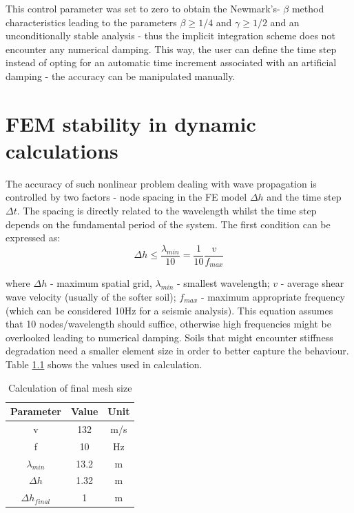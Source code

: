 \documentclass[11pt,a4paper]{report}
\begin{document}
This control parameter was set to zero to obtain the Newmark's- $\beta$ method characteristics leading to the parameters $\beta≥1/4$ and $\gamma ≥1/2$ and an unconditionally stable analysis - thus the implicit integration scheme does not encounter any numerical damping. This way, the user can define the time step instead of opting for an automatic time increment associated with an artificial damping - the accuracy can be manipulated manually.

\newpage
\chapter{FEM stability in dynamic calculations} \label{App:AppendixI}
The accuracy of such nonlinear problem dealing with wave propagation is controlled by two factors - node spacing in the FE model $\Delta h$ and the time step $\Delta t$. The spacing is directly related to the wavelength whilst the time step depends on the fundamental period of the system. 
The first condition can be expressed as:
\begin{equation}
\Delta h\leq\frac{\lambda_{min}}{10}=\frac{1}{10} \frac{v}{f_{max}}
\end{equation}

where $\Delta h$ - maximum spatial grid, $\lambda_{min}$ - smallest wavelength; $v$ - average shear wave velocity (usually of the softer soil); $f_{max}$ - maximum appropriate frequency (which can be considered 10Hz for a seismic analysis). This equation assumes that 10 nodes/wavelength should suffice, otherwise high frequencies might be overlooked leading to numerical damping. Soils that might encounter stiffness degradation need a smaller element size in order to better capture the behaviour. Table \ref{table:Deltah} shows the values used in calculation.

\begin{table}[h!]
	\centering
	\begin{tabular}{|c|c|c|}
		\hline Parameter      &     Value  & Unit  \\
		\hline v      &      132  & m/s  \\
		\hline f & 10 & Hz \\
		\hline $\lambda_{min} $ & 13.2 & m\\
		\hline $\Delta h$ & 1.32 & m \\
		\hline $\Delta h_{final}$ & 1 & m \\
		\hline
	\end{tabular}
	\caption{Calculation of final mesh size}
	\label{table:Deltah}
\end{table}
\end{document}
